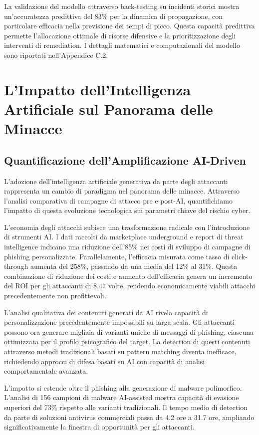 La validazione del modello attraverso back-testing su incidenti storici mostra un'accuratezza predittiva del 83\% per la dinamica di propagazione, con particolare efficacia nella previsione dei tempi di picco. Questa capacità predittiva permette l'allocazione ottimale di risorse difensive e la prioritizzazione degli interventi di remediation. I dettagli matematici e computazionali del modello sono riportati nell'Appendice C.2.

\section{L'Impatto dell'Intelligenza Artificiale sul Panorama delle Minacce}

\subsection{Quantificazione dell'Amplificazione AI-Driven}

L'adozione dell'intelligenza artificiale generativa da parte degli attaccanti rappresenta un cambio di paradigma nel panorama delle minacce. Attraverso l'analisi comparativa di campagne di attacco pre e post-AI, quantifichiamo l'impatto di questa evoluzione tecnologica sui parametri chiave del rischio cyber.

L'economia degli attacchi subisce una trasformazione radicale con l'introduzione di strumenti AI. I dati raccolti da marketplace underground e report di threat intelligence indicano una riduzione dell'85\% nei costi di sviluppo di campagne di phishing personalizzate. Parallelamente, l'efficacia misurata come tasso di click-through aumenta del 258\%, passando da una media del 12\% al 31\%. Questa combinazione di riduzione dei costi e aumento dell'efficacia genera un incremento del ROI per gli attaccanti di 8.47 volte, rendendo economicamente viabili attacchi precedentemente non profittevoli.

L'analisi qualitativa dei contenuti generati da AI rivela capacità di personalizzazione precedentemente impossibili su larga scala. Gli attaccanti possono ora generare migliaia di varianti uniche di messaggi di phishing, ciascuna ottimizzata per il profilo psicografico del target. La detection di questi contenuti attraverso metodi tradizionali basati su pattern matching diventa inefficace, richiedendo approcci di difesa basati su AI con capacità di analisi comportamentale avanzata.

L'impatto si estende oltre il phishing alla generazione di malware polimorfico. L'analisi di 156 campioni di malware AI-assisted mostra capacità di evasione superiori del 73\% rispetto alle varianti tradizionali. Il tempo medio di detection da parte di soluzioni antivirus commerciali passa da 4.2 ore a 31.7 ore, ampliando significativamente la finestra di opportunità per gli attaccanti.

